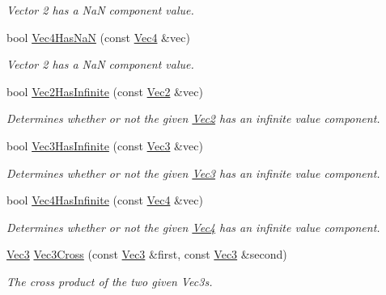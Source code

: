 \begin{DoxyCompactItemize}
\begin{DoxyCompactList}\small\item\em Vector 2 has a Na\+N component value. \end{DoxyCompactList}\item 
bool \hyperlink{group___s_i_s_d_vec_math_gab82fdfebe73934664b56e9ba1174f37f}{Vec4\+Has\+Na\+N} (const \hyperlink{classgfxmath_1_1_vec4}{Vec4} \&vec)
\begin{DoxyCompactList}\small\item\em Vector 2 has a Na\+N component value. \end{DoxyCompactList}\item 
bool \hyperlink{group___s_i_s_d_vec_math_ga6eb96a6532361189c7cacdbd9ae95c90}{Vec2\+Has\+Infinite} (const \hyperlink{classgfxmath_1_1_vec2}{Vec2} \&vec)
\begin{DoxyCompactList}\small\item\em Determines whether or not the given \hyperlink{classgfxmath_1_1_vec2}{Vec2} has an infinite value component. \end{DoxyCompactList}\item 
bool \hyperlink{group___s_i_s_d_vec_math_gae5205e805b23de865db9a40e5936f82a}{Vec3\+Has\+Infinite} (const \hyperlink{classgfxmath_1_1_vec3}{Vec3} \&vec)
\begin{DoxyCompactList}\small\item\em Determines whether or not the given \hyperlink{classgfxmath_1_1_vec3}{Vec3} has an infinite value component. \end{DoxyCompactList}\item 
bool \hyperlink{group___s_i_s_d_vec_math_ga29cd467d514b701c3a796cb75234be0b}{Vec4\+Has\+Infinite} (const \hyperlink{classgfxmath_1_1_vec4}{Vec4} \&vec)
\begin{DoxyCompactList}\small\item\em Determines whether or not the given \hyperlink{classgfxmath_1_1_vec4}{Vec4} has an infinite value component. \end{DoxyCompactList}\item 
\hyperlink{classgfxmath_1_1_vec3}{Vec3} \hyperlink{group___s_i_s_d_vec_math_ga455b2ef17c947a780f2b2b9e4b6cccc8}{Vec3\+Cross} (const \hyperlink{classgfxmath_1_1_vec3}{Vec3} \&first, const \hyperlink{classgfxmath_1_1_vec3}{Vec3} \&second)
\begin{DoxyCompactList}\small\item\em The cross product of the two given Vec3s. \end{DoxyCompactList}\item 

\end{DoxyCompactItemize}
